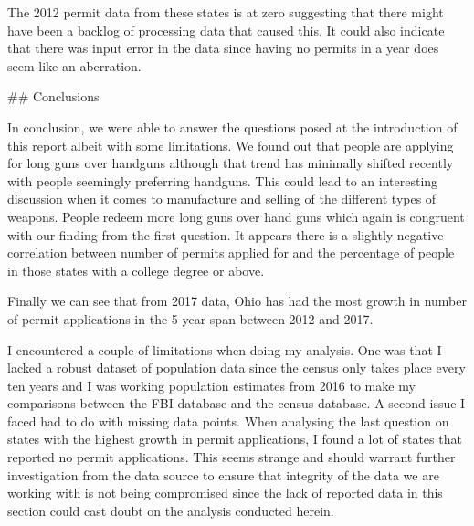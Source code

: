 \documentclass[11pt]{article}
\begin{document}
The 2012 permit data from these states is at zero suggesting that there
might have been a backlog of processing data that caused this. It could
also indicate that there was input error in the data since having no
permits in a year does seem like an aberration.

     \#\# Conclusions

    In conclusion, we were able to answer the questions posed at the
introduction of this report albeit with some limitations. We found out
that people are applying for long guns over handguns although that trend
has minimally shifted recently with people seemingly preferring
handguns. This could lead to an interesting discussion when it comes to
manufacture and selling of the different types of weapons. People redeem
more long guns over hand guns which again is congruent with our finding
from the first question. It appears there is a slightly negative
correlation between number of permits applied for and the percentage of
people in those states with a college degree or above.

Finally we can see that from 2017 data, Ohio has had the most growth in
number of permit applications in the 5 year span between 2012 and 2017.

I encountered a couple of limitations when doing my analysis. One was
that I lacked a robust dataset of population data since the census only
takes place every ten years and I was working population estimates from
2016 to make my comparisons between the FBI database and the census
database. A second issue I faced had to do with missing data points.
When analysing the last question on states with the highest growth in
permit applications, I found a lot of states that reported no permit
applications. This seems strange and should warrant further
investigation from the data source to ensure that integrity of the data
we are working with is not being compromised since the lack of reported
data in this section could cast doubt on the analysis conducted herein.


    
    
    
    
\end{document}
